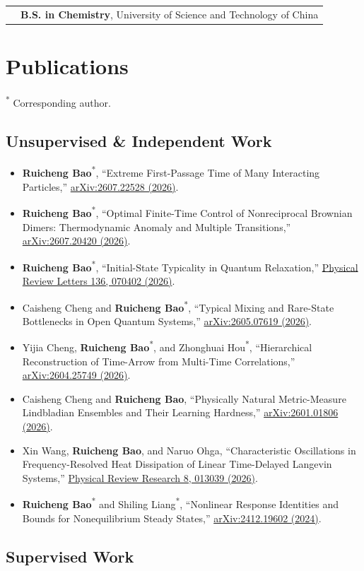 \documentclass[10pt,a4paper]{article}
\makeatletter
\newcommand{\entry}[2]{%
  \begin{tabularx}{\textwidth}{@{}p{0.19\textwidth}X@{}}
    \color{muted}#1 & #2
  \end{tabularx}\par
}
\newcommand{\pub}[4]{%
  \item #1, ``#2,'' \href{#4}{#3}.
}
\newcommand{\corr}[1]{#1\textsuperscript{*}}
\makeatother
\begin{document}
\entry{}{\textbf{B.S. in Chemistry}, University of Science and Technology of China}

\section{Publications}

{\footnotesize\color{muted}\textsuperscript{*} Corresponding author.}

\subsection{Unsupervised \& Independent Work}

\begin{itemize}
  \pub{\corr{\textbf{Ruicheng Bao}}}{Extreme First-Passage Time of Many Interacting Particles}{arXiv:2607.22528 (2026)}{https://arxiv.org/abs/2607.22528}
  \pub{\corr{\textbf{Ruicheng Bao}}}{Optimal Finite-Time Control of Nonreciprocal Brownian Dimers: Thermodynamic Anomaly and Multiple Transitions}{arXiv:2607.20420 (2026)}{https://arxiv.org/abs/2607.20420}
  \pub{\corr{\textbf{Ruicheng Bao}}}{Initial-State Typicality in Quantum Relaxation}{Physical Review Letters 136, 070402 (2026)}{https://doi.org/10.1103/wgr5-lb6b}
  \pub{Caisheng Cheng and \corr{\textbf{Ruicheng Bao}}}{Typical Mixing and Rare-State Bottlenecks in Open Quantum Systems}{arXiv:2605.07619 (2026)}{https://arxiv.org/abs/2605.07619}
  \pub{Yijia Cheng, \corr{\textbf{Ruicheng Bao}}, and \corr{Zhonghuai Hou}}{Hierarchical Reconstruction of Time-Arrow from Multi-Time Correlations}{arXiv:2604.25749 (2026)}{https://arxiv.org/abs/2604.25749}
  \pub{Caisheng Cheng and \textbf{Ruicheng Bao}}{Physically Natural Metric-Measure Lindbladian Ensembles and Their Learning Hardness}{arXiv:2601.01806 (2026)}{https://arxiv.org/abs/2601.01806}
  \pub{Xin Wang, \textbf{Ruicheng Bao}, and Naruo Ohga}{Characteristic Oscillations in Frequency-Resolved Heat Dissipation of Linear Time-Delayed Langevin Systems}{Physical Review Research 8, 013039 (2026)}{https://doi.org/10.1103/x2dm-9p8m}
  \pub{\corr{\textbf{Ruicheng Bao}} and \corr{Shiling Liang}}{Nonlinear Response Identities and Bounds for Nonequilibrium Steady States}{arXiv:2412.19602 (2024)}{https://arxiv.org/abs/2412.19602}
\end{itemize}

\newpage
\subsection{Supervised Work}
\end{document}
